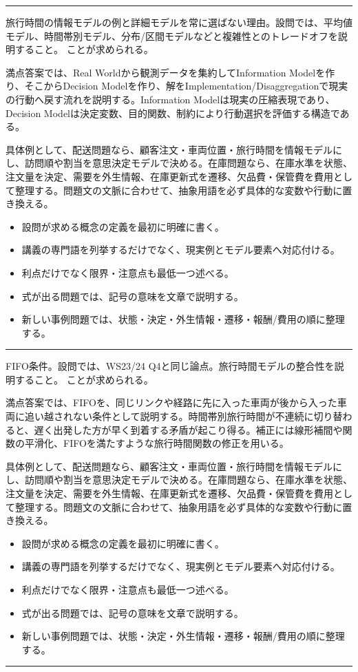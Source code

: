 \vspace{2mm}\hrule\vspace{2mm}
旅行時間の情報モデルの例と詳細モデルを常に選ばない理由。設問では、平均値モデル、時間帯別モデル、分布/区間モデルなどと複雑性とのトレードオフを説明すること。 ことが求められる。\par
{}
満点答案では、Real Worldから観測データを集約してInformation Modelを作り、そこからDecision Modelを作り、解をImplementation/Disaggregationで現実の行動へ戻す流れを説明する。Information Modelは現実の圧縮表現であり、Decision Modelは決定変数、目的関数、制約により行動選択を評価する構造である。\par
{}
具体例として、配送問題なら、顧客注文・車両位置・旅行時間を情報モデルにし、訪問順や割当を意思決定モデルで決める。在庫問題なら、在庫水準を状態、注文量を決定、需要を外生情報、在庫更新式を遷移、欠品費・保管費を費用として整理する。問題文の文脈に合わせて、抽象用語を必ず具体的な変数や行動に置き換える。\par
{}
\begin{itemize}
\item 設問が求める概念の定義を最初に明確に書く。
\item 講義の専門語を列挙するだけでなく、現実例とモデル要素へ対応付ける。
\item 利点だけでなく限界・注意点も最低一つ述べる。
\item 式が出る問題では、記号の意味を文章で説明する。
\item 新しい事例問題では、状態・決定・外生情報・遷移・報酬/費用の順に整理する。
\end{itemize}
\vspace{2mm}\hrule\vspace{2mm}
FIFO条件。設問では、WS23/24 Q4と同じ論点。旅行時間モデルの整合性を説明すること。 ことが求められる。\par
{}
満点答案では、FIFOを、同じリンクや経路に先に入った車両が後から入った車両に追い越されない条件として説明する。時間帯別旅行時間が不連続に切り替わると、遅く出発した方が早く到着する矛盾が起こり得る。補正には線形補間や関数の平滑化、FIFOを満たすような旅行時間関数の修正を用いる。\par
{}
具体例として、配送問題なら、顧客注文・車両位置・旅行時間を情報モデルにし、訪問順や割当を意思決定モデルで決める。在庫問題なら、在庫水準を状態、注文量を決定、需要を外生情報、在庫更新式を遷移、欠品費・保管費を費用として整理する。問題文の文脈に合わせて、抽象用語を必ず具体的な変数や行動に置き換える。\par
{}
\begin{itemize}
\item 設問が求める概念の定義を最初に明確に書く。
\item 講義の専門語を列挙するだけでなく、現実例とモデル要素へ対応付ける。
\item 利点だけでなく限界・注意点も最低一つ述べる。
\item 式が出る問題では、記号の意味を文章で説明する。
\item 新しい事例問題では、状態・決定・外生情報・遷移・報酬/費用の順に整理する。
\end{itemize}
\vspace{2mm}\hrule\vspace{2mm}